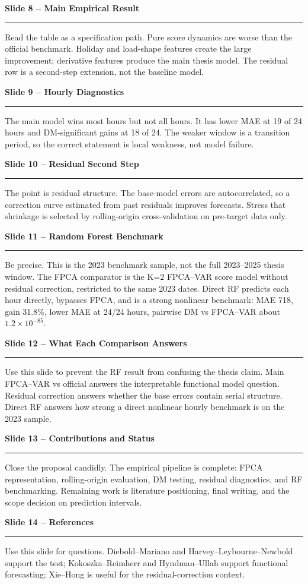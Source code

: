 \documentclass[11pt,a4paper]{article}
\newcommand{\slidenote}[2]{%
  {\large\textbf{#1}}\par
  {\color{rulegray}\rule{\linewidth}{0.4pt}}\par
  \small #2\par\vspace{0.85em}
}
\begin{document}
\slidenote{Slide 8 -- Main Empirical Result}{
Read the table as a specification path. Pure score dynamics are worse than
the official benchmark. Holiday and load-shape features create the large
improvement; derivative features produce the main thesis model. The residual
row is a second-step extension, not the baseline model.
}

\slidenote{Slide 9 -- Hourly Diagnostics}{
The main model wins most hours but not all hours. It has lower MAE at 19 of
24 hours and DM-significant gains at 18 of 24. The weaker window is a
transition period, so the correct statement is local weakness, not model
failure.
}

\slidenote{Slide 10 -- Residual Second Step}{
The point is residual structure. The base-model errors are autocorrelated, so
a correction curve estimated from past residuals improves forecasts. Stress
that shrinkage is selected by rolling-origin cross-validation on pre-target
data only.
}

\slidenote{Slide 11 -- Random Forest Benchmark}{
Be precise. This is the 2023 benchmark sample, not the full 2023--2025 thesis
window. The FPCA comparator is the K=2 FPCA--VAR score model without residual
correction, restricted to the same 2023 dates. Direct RF predicts each hour
directly, bypasses FPCA, and is a strong nonlinear benchmark: MAE 718, gain
31.8\%, lower MAE at 24/24 hours, pairwise DM vs FPCA--VAR about
$1.2\times10^{-85}$.
}

\slidenote{Slide 12 -- What Each Comparison Answers}{
Use this slide to prevent the RF result from confusing the thesis claim.
Main FPCA--VAR vs official answers the interpretable functional model question.
Residual correction answers whether the base errors contain serial structure.
Direct RF answers how strong a direct nonlinear hourly benchmark is on the
2023 sample.
}

\slidenote{Slide 13 -- Contributions and Status}{
Close the proposal candidly. The empirical pipeline is complete: FPCA
representation, rolling-origin evaluation, DM testing, residual diagnostics,
and RF benchmarking. Remaining work is literature positioning, final writing,
and the scope decision on prediction intervals.
}

\slidenote{Slide 14 -- References}{
Use this slide for questions. Diebold--Mariano and Harvey--Leybourne--Newbold
support the test; Kokoszka--Reimherr and Hyndman--Ullah support functional
forecasting; Xie--Hong is useful for the residual-correction context.
}
\end{document}
